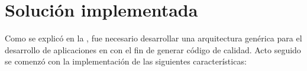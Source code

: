 \chapter{Solución implementada}

Como se explicó en la , fue necesario desarrollar una arquitectura genérica para el desarrollo de aplicaciones en \meteorNAME con el fin de generar código de calidad. Acto seguido se comenzó con la implementación de las siguientes características:




















